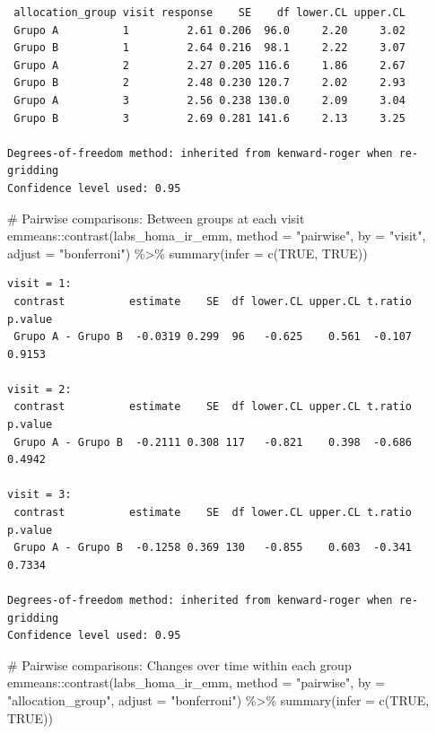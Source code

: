 \documentclass[
  letterpaper,
  DIV=11,
  numbers=noendperiod]{scrartcl}
\newenvironment{Shaded}{\begin{snugshade}}{\end{snugshade}}
\newcommand{\AttributeTok}[1]{\textcolor[rgb]{0.40,0.45,0.13}{#1}}
\newcommand{\CommentTok}[1]{\textcolor[rgb]{0.37,0.37,0.37}{#1}}
\newcommand{\ConstantTok}[1]{\textcolor[rgb]{0.56,0.35,0.01}{#1}}
\newcommand{\FunctionTok}[1]{\textcolor[rgb]{0.28,0.35,0.67}{#1}}
\newcommand{\NormalTok}[1]{\textcolor[rgb]{0.00,0.23,0.31}{#1}}
\newcommand{\SpecialCharTok}[1]{\textcolor[rgb]{0.37,0.37,0.37}{#1}}
\newcommand{\StringTok}[1]{\textcolor[rgb]{0.13,0.47,0.30}{#1}}
\begin{document}
\begin{verbatim}
 allocation_group visit response    SE    df lower.CL upper.CL
 Grupo A          1         2.61 0.206  96.0     2.20     3.02
 Grupo B          1         2.64 0.216  98.1     2.22     3.07
 Grupo A          2         2.27 0.205 116.6     1.86     2.67
 Grupo B          2         2.48 0.230 120.7     2.02     2.93
 Grupo A          3         2.56 0.238 130.0     2.09     3.04
 Grupo B          3         2.69 0.281 141.6     2.13     3.25

Degrees-of-freedom method: inherited from kenward-roger when re-gridding 
Confidence level used: 0.95 
\end{verbatim}

\begin{Shaded}
\begin{Highlighting}[]
\CommentTok{\# Pairwise comparisons: Between groups at each visit}
\NormalTok{emmeans}\SpecialCharTok{::}\FunctionTok{contrast}\NormalTok{(labs\_homa\_ir\_emm, }\AttributeTok{method =} \StringTok{"pairwise"}\NormalTok{, }\AttributeTok{by =} \StringTok{"visit"}\NormalTok{, }\AttributeTok{adjust =} \StringTok{"bonferroni"}\NormalTok{) }\SpecialCharTok{\%\textgreater{}\%} \FunctionTok{summary}\NormalTok{(}\AttributeTok{infer =} \FunctionTok{c}\NormalTok{(}\ConstantTok{TRUE}\NormalTok{, }\ConstantTok{TRUE}\NormalTok{))}
\end{Highlighting}
\end{Shaded}

\begin{verbatim}
visit = 1:
 contrast          estimate    SE  df lower.CL upper.CL t.ratio p.value
 Grupo A - Grupo B  -0.0319 0.299  96   -0.625    0.561  -0.107  0.9153

visit = 2:
 contrast          estimate    SE  df lower.CL upper.CL t.ratio p.value
 Grupo A - Grupo B  -0.2111 0.308 117   -0.821    0.398  -0.686  0.4942

visit = 3:
 contrast          estimate    SE  df lower.CL upper.CL t.ratio p.value
 Grupo A - Grupo B  -0.1258 0.369 130   -0.855    0.603  -0.341  0.7334

Degrees-of-freedom method: inherited from kenward-roger when re-gridding 
Confidence level used: 0.95 
\end{verbatim}

\begin{Shaded}
\begin{Highlighting}[]
\CommentTok{\# Pairwise comparisons: Changes over time within each group}
\NormalTok{emmeans}\SpecialCharTok{::}\FunctionTok{contrast}\NormalTok{(labs\_homa\_ir\_emm, }\AttributeTok{method =} \StringTok{"pairwise"}\NormalTok{, }\AttributeTok{by =} \StringTok{"allocation\_group"}\NormalTok{, }\AttributeTok{adjust =} \StringTok{"bonferroni"}\NormalTok{) }\SpecialCharTok{\%\textgreater{}\%} \FunctionTok{summary}\NormalTok{(}\AttributeTok{infer =} \FunctionTok{c}\NormalTok{(}\ConstantTok{TRUE}\NormalTok{, }\ConstantTok{TRUE}\NormalTok{))}
\end{Highlighting}
\end{Shaded}
\end{document}
